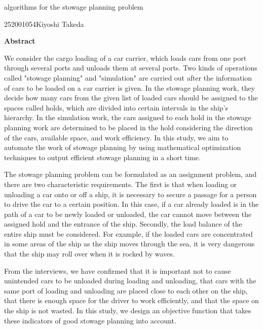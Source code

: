 \newpage
\begin{center}{\LARGE algorithms for the stowage planning problem }\\[0.5cm]
\end{center}
\hfill {\large 252001054\qquad Kiyoshi Takeda}\\[0.5cm]
\begin{center}
{\large \bf Abstract}\\
\end{center}

We consider the cargo loading of a car carrier, which loads cars from one port through several ports and unloads them at several ports.
Two kinds of operations called "stowage planning" and "simulation" are carried out after the information of cars to be loaded on a car carrier is given.
In the stowage planning work, they decide how many cars from the given list of loaded cars should be assigned to the spaces called holds, which are divided into certain intervals in the ship's hierarchy.
In the simulation work, the cars assigned to each hold in the stowage planning work are determined to be placed in the hold considering the direction of the cars, available space, and work efficiency.
In this study, we aim to automate the work of stowage planning by using mathematical optimization techniques to output efficient stowage planning in a short time.

The stowage planning problem can be formulated as an assignment problem, and there are two characteristic requirements.
The first is that when loading or unloading a car onto or off a ship, it is necessary to secure a passage for a person to drive the car to a certain position.
In this case, if a car already loaded is in the path of a car to be newly loaded or unloaded, the car cannot move between the assigned hold and the entrance of the ship.
Secondly, the load balance of the entire ship must be considered.
For example, if the loaded cars are concentrated in some areas of the ship as the ship moves through the sea, it is very dangerous that the ship may roll over when it is rocked by waves.

From the interviews, we have confirmed that it is important not to cause unintended cars to be unloaded during loading and unloading, that cars with the same port of loading and unloading are placed close to each other on the ship, that there is enough space for the driver to work efficiently, and that the space on the ship is not wasted. In this study, we design an objective function that takes these indicators of good stowage planning into account.

